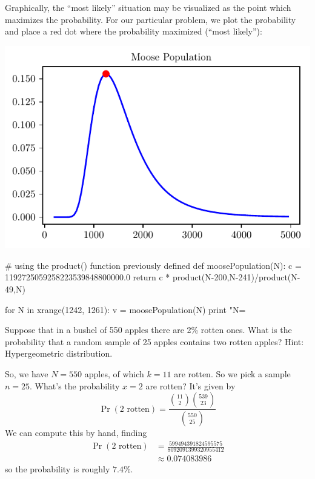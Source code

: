 Graphically, the ``most likely'' situation may be visualized as the
point which maximizes the probability. For our particular problem, we
plot the probability and place a red dot where the probability maximized
(``most likely''): 

\begin{center}
\includegraphics{img/moose.pdf}
\end{center}


\begin{python}
# using the product() function previously defined
def moosePopulation(N):
    c = 1192725059258223539848800000.0
    return c * product(N-200,N-241)/product(N-49,N)

for N in xrange(1242, 1261):
    v = moosePopulation(N)
    print "N=%
\end{python}

Suppose that in a bushel of 550 apples there are 2\% rotten ones. What
is the probability that a random sample of 25 apples contains two
rotten apples? Hint: Hypergeometric distribution.

So, we have $N=550$ apples, of which $k=11$ are rotten. So we pick a
sample $n=25$. What's the probability $x=2$ are rotten? It's given by
\begin{equation}
\Pr(\mbox{2 rotten})=\frac{\binom{11}{2}\binom{539}{23}}{\binom{550}{25}}
\end{equation}
We can compute this by hand, finding
\begin{equation}
\begin{split}
\Pr(\mbox{2 rotten})
&=\frac{599494391824595575}{8092091399320955412}\\
&\approx 0.074083986
\end{split}
\end{equation}
so the probability is roughly $7.4\%$.

